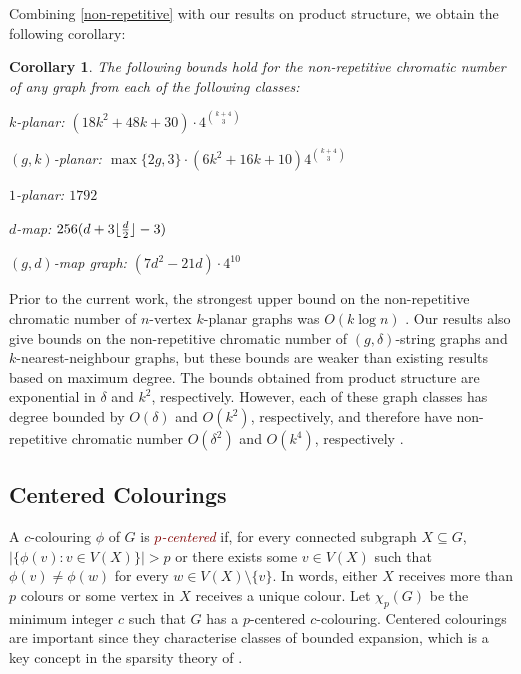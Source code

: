 \documentclass{patmorin}
\theoremstyle{plain}
\newtheorem{cor}[thm]{Corollary}
\theoremstyle{definition}
\newcommand{\defin}[1]{\textcolor{Maroon}{\emph{#1}}}
\DeclarePairedDelimiter{\floor}{\lfloor}{\rfloor}
\begin{document}
Combining \cref{non-repetitive} with our results on product structure, we obtain the following corollary:
\begin{cor}\label{non-repetitive_cor}
  The following bounds hold for the non-repetitive chromatic number of any graph from each of the following classes:
  \begin{compactitem}
    \item $k$-planar: $(18k^2+48k+30)\cdot 4^{\binom{k+4}{3}}$
    \item $(g,k)$-planar: $\max\{2g,3\}\cdot(6k^2+16k+10) 4^{\binom{k+4}{3}}$
    \item $1$-planar: $1792$
    \item $d$-map: $256(d+3\floor{\frac{d}{2}}-3)$
    \item $(g,d)$-map graph: $(7d^2-21d)\cdot 4^{10}$
  \end{compactitem}
\end{cor}

Prior to the current work, the strongest upper bound on the non-repetitive chromatic number of $n$-vertex  $k$-planar graphs was $O(k\log n)$ \cite{dujmovic.morin.ea:layered}.  Our results also give bounds on the non-repetitive chromatic number of $(g,\delta)$-string graphs and $k$-nearest-neighbour graphs, but these bounds are weaker than existing results based on maximum degree.  The bounds obtained from product structure are exponential in $\delta$ and $k^2$, respectively.  However, each of these graph classes has degree bounded by $O(\delta)$ and $O(k^2)$, respectively, and therefore have non-repetitive chromatic number $O(\delta^2)$ and $O(k^{4})$, respectively \cite{DJKW16}.

\subsection{Centered Colourings}
\label{centered-colourings}

A $c$-colouring $\phi$ of $G$ is \defin{$p$-centered} if, for every connected subgraph $X\subseteq G$, $|\{\phi(v):v\in V(X)\}| > p$ or there exists some $v\in V(X)$ such that $\phi(v)\neq \phi(w)$ for every $w\in V(X)\setminus\{v\}$.  In words, either $X$ receives more than $p$ colours or some vertex in $X$ receives a unique colour.  Let $\chi_p(G)$ be the minimum integer $c$ such that $G$ has a $p$-centered $c$-colouring. Centered colourings are important since they characterise classes of bounded expansion, which is a key concept in the sparsity theory of \citet{Sparsity}.
\end{document}
